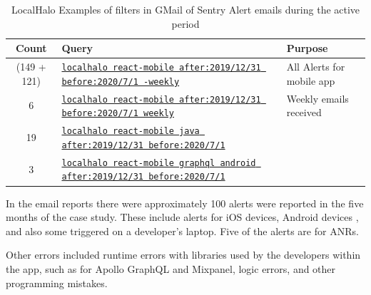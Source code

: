 \begin{table}
    \centering
    \captionsetup{font=scriptsize}
    \tiny
    \begin{tabular}{cll}
        Count & Query & Purpose \\
        \toprule
       (149 + 121) & \href{https://mail.google.com/mail/u/0/#search/localhalo+react-mobile++after\%3A2019\%2F12\%2F31+before\%3A2020\%2F7\%2F1+-weekly/p3}{\texttt{localhalo react-mobile  after:2019/12/31 before:2020/7/1 -weekly}} &All Alerts for mobile app \\
       6 & \href{https://mail.google.com/mail/u/0/#search/localhalo+react-mobile++after\%3A2019\%2F12\%2F31+before\%3A2020\%2F7\%2F1+weekly}{\texttt{localhalo react-mobile  after:2019/12/31 before:2020/7/1 weekly}} & Weekly emails received \\
        19 & \href{https://mail.google.com/mail/u/0/#search/localhalo+react-mobile+java+after\%3A2019\%2F12\%2F31+before\%3A2020\%2F7\%2F1}{\texttt{localhalo react-mobile java after:2019/12/31 before:2020/7/1}} \\
        3 & \href{https://mail.google.com/mail/u/0/#search/localhalo+react-mobile+graphql+android+after\%3A2019\%2F12\%2F31+before\%3A2020\%2F7\%2F1}{\texttt{localhalo react-mobile graphql android after:2019/12/31 before:2020/7/1}} & \\
       \bottomrule
    \end{tabular}
    \caption{LocalHalo Examples of filters in GMail of Sentry Alert emails during the active period}
    \label{tab:localhalo-gmail-filters-sentry-alert-emails}
\end{table}



In the email reports there were approximately 100 alerts were reported in the five months of the case study. These include alerts for iOS devices, Android devices %
, and also some triggered on a developer's laptop. Five of the alerts are for ANRs. 



Other errors included runtime errors with libraries used by the developers within the app, such as for Apollo GraphQL and Mixpanel, logic errors, and other programming mistakes. 



